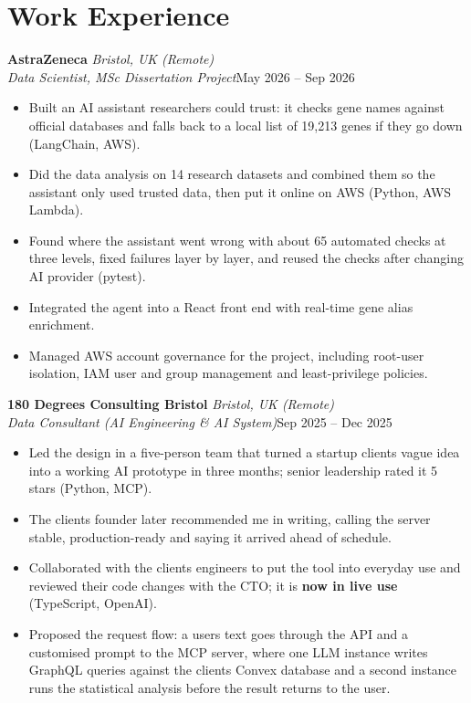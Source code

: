 \documentclass[a4paper,11pt]{article}
\newcommand{\role}[4]{%
  \textbf{#1}{\color{muted}\,\textperiodcentered\,\textit{#2}}\\
  \textit{#4}\hfill{\color{muted}#3}\par}
\newcommand{\gap}{\vspace{5pt}}
\newcommand{\num}[1]{\textbf{#1}}   %
\begin{document}
\section{Work Experience}
\role{AstraZeneca}{Bristol, UK (Remote)}{May 2026 – Sep 2026}{Data Scientist, MSc Dissertation Project}
\begin{itemize}
  \item Built an AI assistant researchers could trust: it checks gene names against official databases and falls back to a local list of 19,213 genes if they go down (LangChain, AWS).
  \item Did the data analysis on 14 research datasets and combined them so the assistant only used trusted data, then put it online on AWS (Python, AWS Lambda).
  \item Found where the assistant went wrong with about 65 automated checks at three levels, fixed failures layer by layer, and reused the checks after changing AI provider (pytest).
  \item Integrated the agent into a React front end with real-time gene alias enrichment.
  \item Managed AWS account governance for the project, including root-user isolation, IAM user and group management and least-privilege policies.
\end{itemize}
\gap
{}
\role{180 Degrees Consulting Bristol}{Bristol, UK (Remote)}{Sep 2025 – Dec 2025}{Data Consultant (AI Engineering \& AI System)}
\begin{itemize}
  \item Led the design in a five-person team that turned a startup client\textquotesingle{}s vague idea into a working AI prototype in three months; senior leadership rated it 5 stars (Python, MCP).
  \item The client\textquotesingle{}s founder later recommended me in writing, calling the server \textquotesingle{}stable, production-ready\textquotesingle{} and saying it arrived ahead of schedule.
  \item Collaborated with the client\textquotesingle{}s engineers to put the tool into everyday use and reviewed their code changes with the CTO; it is \num{now in live use} (TypeScript, OpenAI).
  \item Proposed the request flow: a user\textquotesingle{}s text goes through the API and a customised prompt to the MCP server, where one LLM instance writes GraphQL queries against the client\textquotesingle{}s Convex database and a second instance runs the statistical analysis before the result returns to the user.
\end{itemize}
\end{document}
